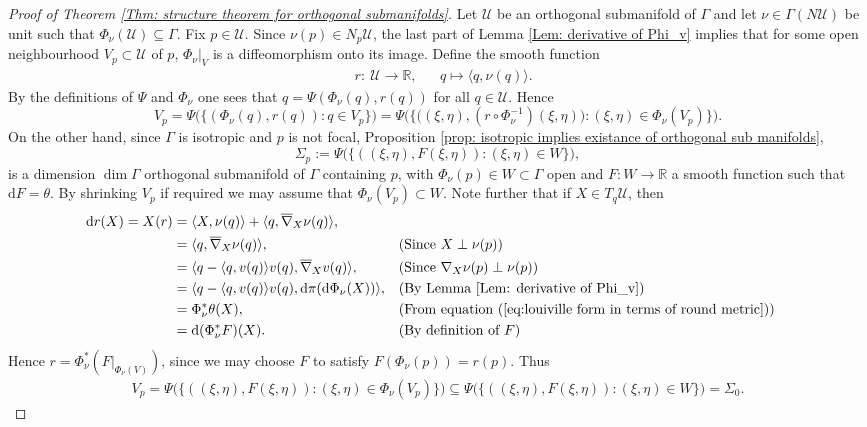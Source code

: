 \documentclass[12pt]{amsart}
\theoremstyle{plain}
\theoremstyle{definition}
\newcommand{\td}{\mathrm{d}}
\numberwithin{equation}{section}
\begin{document}
\begin{proof}[Proof of Theorem \ref{Thm: structure theorem for orthogonal submanifolds}]
    Let $\mathcal{U}$ be an orthogonal submanifold of $\Gamma$ and let $\nu\in\Gamma(N\mathcal{U})$ be unit such that $\Phi_\nu(\mathcal{U})\subseteq \Gamma$. Fix $p\in \mathcal{U}$. Since $\nu(p)\in N_p\mathcal{U}$, the last part of Lemma \ref{Lem: derivative of Phi_v} implies that for some open neighbourhood $V_p\subset \mathcal{U}$ of $p$,  $\Phi_\nu|_{V}$ is a diffeomorphism onto its image.  Define the smooth function
    \begin{align*}
        &r:~\mathcal{U}\to\mathbb{R}, &&q \mapsto \langle q, \nu(q)\rangle.
    \end{align*}
   By the definitions of $\Psi$ and $\Phi_\nu$ one sees that
    $q=\Psi(\Phi_\nu(q),r(q))$ for all $q\in \mathcal{U}$. Hence
    \[
    V_p=\Psi\Big(\Big\{(\Phi_\nu(q),r(q)): q\in V_p\Big\}\Big)=\Psi\Big(\Big\{\big((\xi,\eta),(r\circ\Phi_\nu^{-1})(\xi,\eta)\big): (\xi,\eta)\in \Phi_\nu(V_p)\Big\}\Big).
    \]
    On the other hand, since $\Gamma$ is isotropic and $p$ is not focal, Proposition \ref{prop: isotropic implies existance of orthogonal sub manifolds},
    \[
    \Sigma_p:=\Psi\Big(\Big\{((\xi,\eta),F(\xi,\eta)): (\xi,\eta)\in W\Big\}\Big),
    \]
    is a dimension $\dim \Gamma$ orthogonal submanifold of $\Gamma$ containing $p$, with $\Phi_\nu(p)\in W\subset \Gamma$ open and $F:W\to\mathbb{R}$ a smooth function such that $\td F=\theta$. By shrinking $V_p$ if required we may assume that $\Phi_\nu(V_p)\subset W$. Note further that if $X\in T_q\mathcal{U}$, then
    \begin{align*}
        \td r(X)=X(r)&=\langle X, \nu(q) \rangle + \langle q, \overline\nabla_X \nu(q)\rangle,\\
        &=\langle q, \overline\nabla_X \nu(q)\rangle, &&\text{(Since $X\perp \nu(p)$)}\\
        &=\langle q-\langle q,v(q)\rangle v(q), \overline\nabla_X v(q)\rangle, &&\text{(Since $\nabla_X\nu(p)\perp \nu(p)$)}\\
        &=\langle q-\langle q,v(q)\rangle v(q), \td\pi(\td\Phi_\nu(X))\rangle, &&\text{(By Lemma \ref{Lem: derivative of Phi_v})}\\
        &=\Phi_\nu^\ast\theta(X), &&\text{(From equation (\ref{eq:louiville form in terms of round metric}))}\\
        &=\td(\Phi_\nu^\ast F)(X). &&\text{(By definition of $F$)}
    \end{align*}
    Hence $r=\Phi_\nu^\ast (F|_{\Phi_\nu(V)})$, since we may choose $F$ to satisfy $F(\Phi_\nu(p))=r(p)$. Thus
    \begin{align*}
        V_p=\Psi\Big(\Big\{((\xi,\eta),F(\xi,\eta)):(\xi,\eta)\in \Phi_\nu(V_p)\Big\}\Big)
        \subseteq \Psi\Big(\Big\{((\xi,\eta),F(\xi,\eta)): (\xi,\eta)\in W\Big\}\Big)
        =\Sigma_0.
    \end{align*}
\end{proof}
\end{document}

